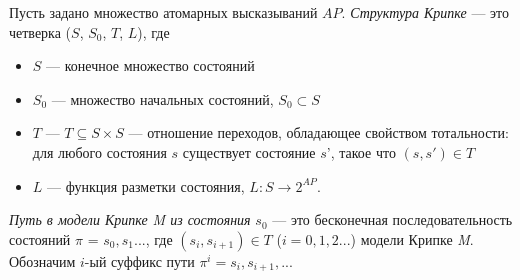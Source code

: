 \documentclass[12pt]{article}
\begin{document}
Пусть задано множество атомарных высказываний $AP$.
\textit{Структура Крипке} — это четверка ($S$, $S_{0}$, $T$, $L$), где
\begin{itemize}
    \item $S$ — конечное множество состояний
    \item $S_{0}$ — множество начальных состояний, $S_{0} \subset S $
    \item $T$ — $T \subseteq S \times S$ — отношение переходов, обладающее свойством тотальности: для любого состояния $s$ существует состояние $s$', такое что $(s, s') \in T$
    \item $L$ — функция разметки состояния, $L: S \rightarrow 2^{AP} $.
\end{itemize}




\textit{Путь в модели Крипке M из состояния} $s_0$ — это бесконечная последовательность состояний $\pi$ = $s_0, s_1...$, где $(s_{i}, s_{i+1}) \in T$ ($i = 0, 1, 2...$) модели Крипке \textit{M}. 
Обозначим $i$-ый суффикс пути $\pi^{i} = s_{i}, s_{i+1},...$
\end{document}
